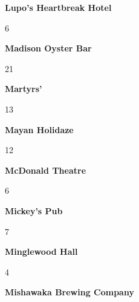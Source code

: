 \newline 
\begin{center}\textbf{Lupo's Heartbreak Hotel}\end{center}
\begin{center}6\end{center} 
\newline 
\begin{center}\textbf{Madison Oyster Bar}\end{center}
\begin{center}21\end{center} 
\newline 
\begin{center}\textbf{Martyrs'}\end{center}
\begin{center}13\end{center} 
\newline 
\begin{center}\textbf{Mayan Holidaze}\end{center}
\begin{center}12\end{center} 
\newline 
\begin{center}\textbf{McDonald Theatre}\end{center}
\begin{center}6\end{center} 
\newline 
\begin{center}\textbf{Mickey's Pub}\end{center}
\begin{center}7\end{center} 
\newline 
\begin{center}\textbf{Minglewood Hall}\end{center}
\begin{center}4\end{center} 
\newline 
\begin{center}\textbf{Mishawaka Brewing Company}\end{center}
